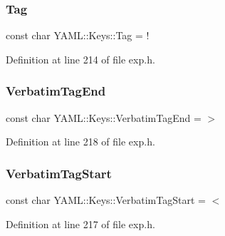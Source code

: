 \subsubsection{\texorpdfstring{Tag}{Tag}}
{\footnotesize\ttfamily const char Y\+A\+M\+L\+::\+Keys\+::\+Tag = \textquotesingle{}!\textquotesingle{}}



Definition at line 214 of file exp.\+h.

\mbox{\label{namespace_y_a_m_l_1_1_keys_a15bf1be5f6170a1c1672b4f6aaa59098}} 
\subsubsection{\texorpdfstring{VerbatimTagEnd}{VerbatimTagEnd}}
{\footnotesize\ttfamily const char Y\+A\+M\+L\+::\+Keys\+::\+Verbatim\+Tag\+End = \textquotesingle{}$>$\textquotesingle{}}



Definition at line 218 of file exp.\+h.

\mbox{\label{namespace_y_a_m_l_1_1_keys_a631df87c258dbfe94949a4e21904440f}} 
\subsubsection{\texorpdfstring{VerbatimTagStart}{VerbatimTagStart}}
{\footnotesize\ttfamily const char Y\+A\+M\+L\+::\+Keys\+::\+Verbatim\+Tag\+Start = \textquotesingle{}$<$\textquotesingle{}}



Definition at line 217 of file exp.\+h.

